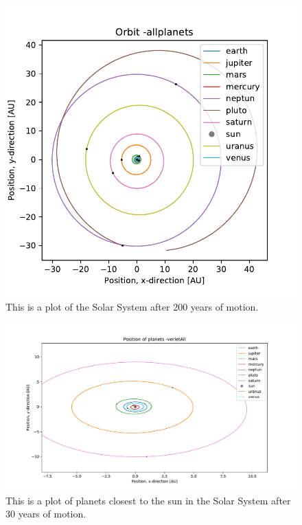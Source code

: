 \begin{figure}[H]
\includegraphics[width=1\linewidth]{../results/plots/plotof-earthjupiter-allplanets.pdf}\caption{This is a plot of the Solar System after 200 years of motion.}\label{fig:solarsystem_allplanets}
\end{figure}


\begin{figure}[H]
\includegraphics[width=1\linewidth]{../results/plots/innerplanets-verletAll.pdf}\caption{This is a plot of planets closest to the sun in the Solar System after 30 years of motion.}\label{fig:solarsystem_innerplanets}
\end{figure}
	
